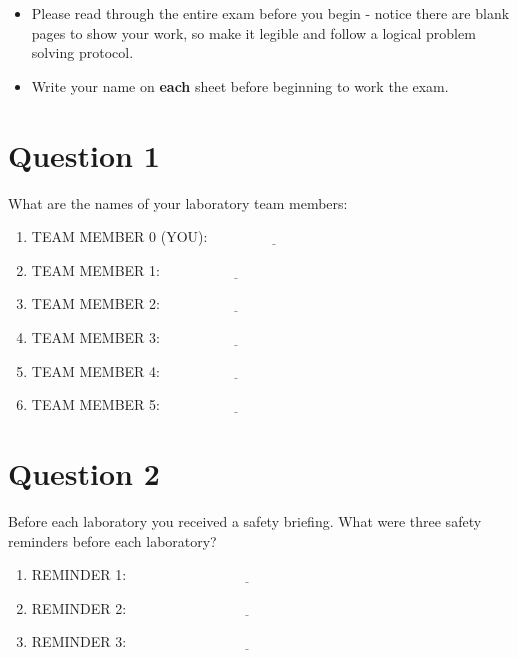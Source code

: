 \documentclass[12pt]{article}
\begin{document}
\section*{ }
\begin{itemize}
\item Please read through the entire exam before you begin - notice there are blank pages to show your work, so make it legible and follow a logical problem solving protocol.
\item Write your name on \textbf{each} sheet before beginning to work the exam.
\end{itemize}
\section*{Question 1}
What are the names of your laboratory team members:
\begin{enumerate}
\item TEAM MEMBER 0 (YOU): $\underline{~~~~~~~~~~~~~~~~~~~~~~~~~~~~~~~~~~~~~~~~}$
\item TEAM MEMBER 1: $\underline{~~~~~~~~~~~~~~~~~~~~~~~~~~~~~~~~~~~~~~~~~~~~~~}$
\item TEAM MEMBER 2: $\underline{~~~~~~~~~~~~~~~~~~~~~~~~~~~~~~~~~~~~~~~~~~~~~~}$
\item TEAM MEMBER 3: $\underline{~~~~~~~~~~~~~~~~~~~~~~~~~~~~~~~~~~~~~~~~~~~~~~}$
\item TEAM MEMBER 4: $\underline{~~~~~~~~~~~~~~~~~~~~~~~~~~~~~~~~~~~~~~~~~~~~~~}$
\item TEAM MEMBER 5: $\underline{~~~~~~~~~~~~~~~~~~~~~~~~~~~~~~~~~~~~~~~~~~~~~~}$
\end{enumerate}
\clearpage
\section*{Question 2}
Before each laboratory you received a safety briefing.  What were three safety reminders before each laboratory?
\begin{enumerate}
\item REMINDER 1: $\underline{~~~~~~~~~~~~~~~~~~~~~~~~~~~~~~~~~~~~~~~~~~~~~~~~~~~~~~~~~~~~~~~~~~~~~~~~~~~}$
\item REMINDER 2: $\underline{~~~~~~~~~~~~~~~~~~~~~~~~~~~~~~~~~~~~~~~~~~~~~~~~~~~~~~~~~~~~~~~~~~~~~~~~~~~}$
\item REMINDER 3: $\underline{~~~~~~~~~~~~~~~~~~~~~~~~~~~~~~~~~~~~~~~~~~~~~~~~~~~~~~~~~~~~~~~~~~~~~~~~~~~}$
\end{enumerate}
\clearpage
\end{document}
